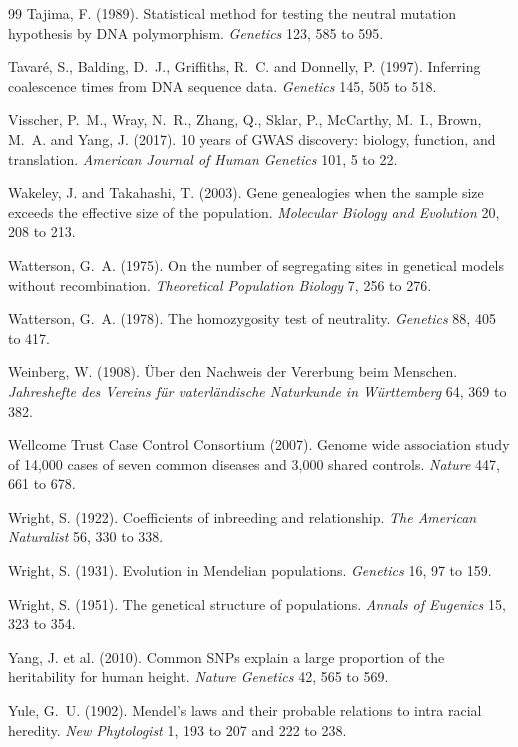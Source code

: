 \begin{thebibliography}{99}
Tajima, F. (1989). Statistical method for testing the neutral mutation hypothesis by DNA
polymorphism. \emph{Genetics} 123, 585 to 595.

Tavar\'e, S., Balding, D.~J., Griffiths, R.~C. and Donnelly, P. (1997). Inferring coalescence
times from DNA sequence data. \emph{Genetics} 145, 505 to 518.

Visscher, P.~M., Wray, N.~R., Zhang, Q., Sklar, P., McCarthy, M.~I., Brown, M.~A. and Yang, J.
(2017). 10 years of GWAS discovery: biology, function, and translation. \emph{American Journal of
Human Genetics} 101, 5 to 22.

Wakeley, J. and Takahashi, T. (2003). Gene genealogies when the sample size exceeds the effective
size of the population. \emph{Molecular Biology and Evolution} 20, 208 to 213.

Watterson, G.~A. (1975). On the number of segregating sites in genetical models without
recombination. \emph{Theoretical Population Biology} 7, 256 to 276.

Watterson, G.~A. (1978). The homozygosity test of neutrality. \emph{Genetics} 88, 405 to 417.

Weinberg, W. (1908). \"Uber den Nachweis der Vererbung beim Menschen. \emph{Jahreshefte des
Vereins f\"ur vaterl\"andische Naturkunde in W\"urttemberg} 64, 369 to 382.

Wellcome Trust Case Control Consortium (2007). Genome wide association study of 14,000 cases of
seven common diseases and 3,000 shared controls. \emph{Nature} 447, 661 to 678.

Wright, S. (1922). Coefficients of inbreeding and relationship. \emph{The American Naturalist} 56,
330 to 338.

Wright, S. (1931). Evolution in Mendelian populations. \emph{Genetics} 16, 97 to 159.

Wright, S. (1951). The genetical structure of populations. \emph{Annals of Eugenics} 15, 323 to
354.

Yang, J. et al. (2010). Common SNPs explain a large proportion of the heritability for human
height. \emph{Nature Genetics} 42, 565 to 569.

Yule, G.~U. (1902). Mendel's laws and their probable relations to intra racial heredity.
\emph{New Phytologist} 1, 193 to 207 and 222 to 238.

\end{thebibliography}
